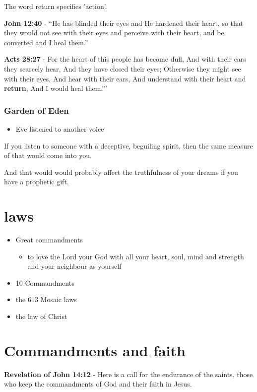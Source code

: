 \documentclass[11pt]{article}
\begin{document}
The word return specifies 'action'.

\textbf{John 12:40} - “He has blinded their eyes and He hardened their heart, so that they would not see with their eyes and perceive with their heart, and be converted and I heal them.”

\textbf{Acts 28:27} - For the heart of this people has become dull, And with their ears they scarcely hear, And they have closed their eyes; Otherwise they might see with their eyes, And hear with their ears, And understand with their heart and \textbf{return}, And I would heal them.”’

\subsubsection{Garden of Eden}
\label{sec:org241e7c3}
\begin{itemize}
\item Eve listened to another voice
\end{itemize}

If you listen to someone with a deceptive, beguiling spirit, then the same measure of that would come into you.

And that would would probably affect the truthfulness of your dreams if you have a prophetic gift.

\section{laws}
\label{sec:orga0c29ec}
\begin{itemize}
\item Great commandments
\begin{itemize}
\item to love the Lord your God with all your heart, soul, mind and strength and your neighbour as yourself
\end{itemize}
\item 10 Commandments
\item the 613 Mosaic laws
\item the law of Christ
\end{itemize}

\section{Commandments and faith}
\label{sec:org6c42250}
\textbf{Revelation of John 14:12} - Here is a call for the endurance of the saints, those who keep the commandments of God and their faith in Jesus.
\end{document}
